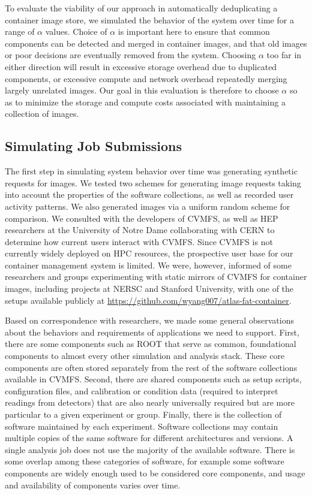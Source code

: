 \documentclass[sigconf]{acmart}
\begin{document}
To evaluate the viability of our approach in automatically deduplicating a container image store,
we simulated the behavior of the system over time for a range of $\alpha$ values.
Choice of $\alpha$ is important here to ensure that common components can be detected and merged in container images,
and that old images or poor decisions are eventually removed from the system.
Choosing $\alpha$ too far in either direction will result in excessive storage overhead due to duplicated components,
or excessive compute and network overhead repeatedly merging largely unrelated images.
Our goal in this evaluation is therefore to choose $\alpha$ so as to minimize the storage and compute costs associated with maintaining a collection of images.

\subsection{Simulating Job Submissions}

The first step in simulating system behavior over time was generating synthetic requests for images.
We tested two schemes for generating image requests taking into account the properties of the software collections,
as well as recorded user activity patterns.
We also generated images via a uniform random scheme for comparison.
We consulted with the developers of CVMFS,
as well as HEP researchers at the University of Notre Dame collaborating with CERN to determine how current users interact with CVMFS.
Since CVMFS is not currently widely deployed on HPC resources,
the prospective user base for our container management system is limited.
We were, however, informed of some researchers and groups experimenting with static mirrors of CVMFS for container images,
including projects at NERSC and Stanford University,
with one of the setups available publicly at \url{https://github.com/wyang007/atlas-fat-container}.

Based on correspondence with researchers,
we made some general observations about the behaviors and requirements of applications we need to support.
First, there are some components such as ROOT that serve as common, foundational components to almost every other simulation and analysis stack.
These core components are often stored separately from the rest of the software collections available in CVMFS.
Second, there are shared components such as setup scripts, configuration files, and calibration or condition data (required to interpret readings from detectors) that are also nearly universally required but are more particular to a given experiment or group.
Finally, there is the collection of software maintained by each experiment.
Software collections may contain multiple copies of the same software for different architectures and versions.
A single analysis job does not use the majority of the available software.
There is some overlap among these categories of software,
for example some software components are widely enough used to be considered core components,
and usage and availability of components varies over time.
\end{document}
